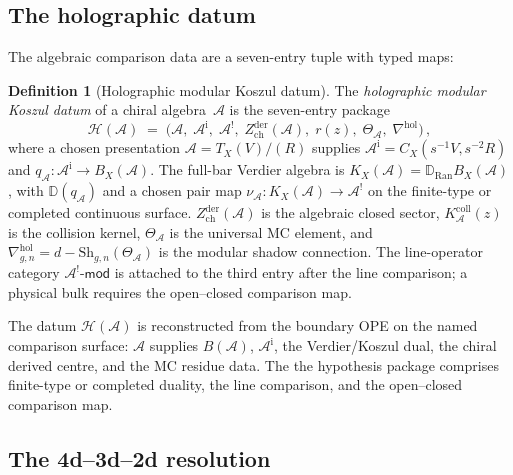 \documentclass[11pt,reqno]{amsart}
\theoremstyle{definition}
\newtheorem{definition}[theorem]{Definition}
\theoremstyle{remark}
\providecommand{\cA}{\mathcal{A}}
\providecommand{\Ran}{\mathrm{Ran}}
\numberwithin{equation}{section}
\begin{document}
\subsection{The holographic datum}
\label{ssec:holographic-datum}

The algebraic comparison data are a seven-entry tuple with typed maps:

\begin{definition}[Holographic modular Koszul datum]
\label{def:holographic}
The \emph{holographic modular Koszul datum} of a chiral
algebra~$\cA$ is the seven-entry package
\begin{equation}\label{eq:holographic-datum}
\mathcal{H}(\cA)
\;=\;
\bigl(\cA,\;
\cA^{\mathrm i},\;
\cA^!,\;
Z^{\mathrm{der}}_{\mathrm{ch}}(\cA),\;
r(z),\;
\Theta_\cA,\;
\nabla^{\mathrm{hol}}\bigr)\,,
\end{equation}
where a chosen presentation $\cA=T_X(V)/(R)$ supplies
$\cA^{\mathrm i}=C_X(s^{-1}V,s^{-2}R)$ and
$q_\cA\colon\cA^{\mathrm i}\to B_X(\cA)$.
The full-bar Verdier algebra is
$K_X(\cA)=\mathbb D_{\Ran}B_X(\cA)$, with
$\mathbb D(q_\cA)$ and a chosen pair map
$\nu_\cA\colon K_X(\cA)\to\cA^!$ on the finite-type or completed
continuous surface.
$Z^{\mathrm{der}}_{\mathrm{ch}}(\cA)$ is the algebraic closed
sector, $K_\cA^{\mathrm{coll}}(z)$ is the collision kernel,
$\Theta_\cA$ is the universal MC element, and
$\nabla^{\mathrm{hol}}_{g,n} = d -
\mathrm{Sh}_{g,n}(\Theta_\cA)$ is the modular shadow
connection. The line-operator category
$\cA^!\text{-}\mathsf{mod}$ is attached to the third entry after
the line comparison; a physical bulk requires the open--closed
comparison map.
\end{definition}

The datum $\mathcal{H}(\cA)$ is reconstructed from the boundary
OPE on the named comparison surface:
$\cA$ supplies $B(\cA)$, $\cA^{\mathrm i}$, the Verdier/Koszul
dual, the chiral derived centre, and the MC residue data. The
the hypothesis package comprises finite-type or completed duality,
the line comparison, and the open--closed comparison map.

\subsection{The 4d--3d--2d resolution}
\label{ssec:4d-3d-2d}
\end{document}
